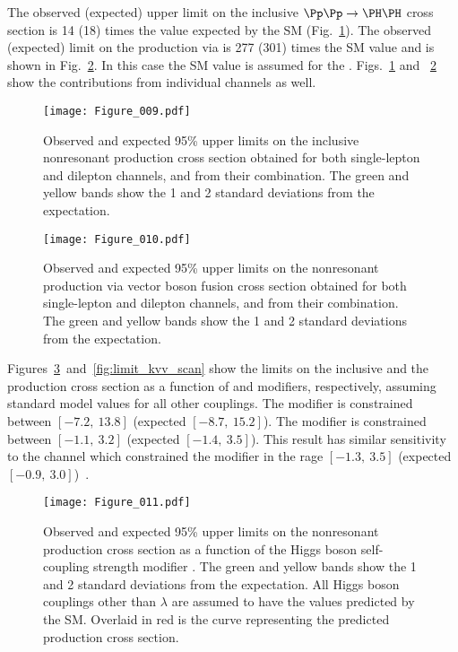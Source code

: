 The observed (expected) upper limit on the inclusive $\Pp\Pp\to\HH$ cross section is 14 (18) times the value expected by the SM (Fig.~\ref{fig:Limit_SM}). The observed (expected) limit on the \HH production via \VBF is 277 (301) times the SM value and is shown in Fig.~\ref{fig:Limit_VBF}. In this case the SM value is assumed for the \GGF. Figs.~\ref{fig:Limit_SM} and ~\ref{fig:Limit_VBF} show the contributions from individual channels as well.

\begin{figure}[htb!]
  \centering
  \texttt{[image: Figure\_009.pdf]}
  \caption{Observed and expected 95\% \CL upper limits on the inclusive nonresonant \HH production cross section obtained for both single-lepton and dilepton channels, and from their combination. The green and yellow bands show the 1 and 2 standard deviations from the expectation.}
  \label{fig:Limit_SM}
\end{figure}

\begin{figure}[htb!]
  \centering
  \texttt{[image: Figure\_010.pdf]}
  \caption{Observed and expected 95\% \CL upper limits on the nonresonant \HH production via vector boson fusion cross section obtained for both single-lepton and dilepton channels, and from their combination. The green and yellow bands show the 1 and 2 standard deviations from the expectation.}
  \label{fig:Limit_VBF}
\end{figure}

Figures~\ref{fig:limit_kl_scan}~and~\ref{fig:limit_kvv_scan} show the limits on the inclusive and the \VBF production cross section as a function of \klambda and \CVV modifiers, respectively, assuming standard model values for all other couplings.
The \klambda modifier is constrained between $[-7.2, \ 13.8]$ (expected $[-8.7, \ 15.2]$).
The \CVV modifier is constrained between $[-1.1, \ 3.2]$ (expected $[-1.4, \ 3.5]$).
This result has similar sensitivity to the \bbgg channel which constrained the \klambda modifier in the rage $[-1.3, \ 3.5]$ (expected $[-0.9, \ 3.0]$)~\cite{CMS_HHbbgg_R2Legacy}.

\begin{figure}[htb!]
  \centering
  \texttt{[image: Figure\_011.pdf]}
  \caption{Observed and expected 95\% \CL upper limits on the nonresonant \HH production cross section as a function of the Higgs boson self-coupling strength modifier \klambda. The green and yellow bands show the 1 and 2 standard deviations from the expectation. All Higgs boson couplings other than $\lambda$ are assumed to have the values predicted by the SM. Overlaid in red is the curve representing the predicted \HH production cross section.}
  \label{fig:limit_kl_scan}
\end{figure}


